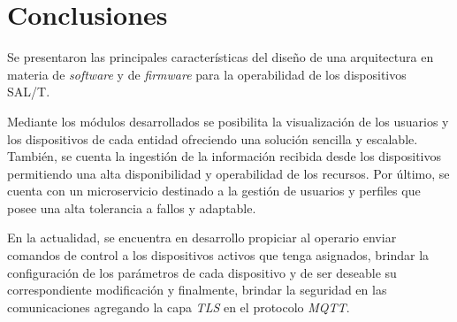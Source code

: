 
\section{Conclusiones}

Se presentaron las principales características del diseño de una arquitectura en materia de \textit{software} y de \textit{firmware} para la operabilidad de los dispositivos SAL/T.

Mediante los módulos desarrollados se posibilita la visualización de los usuarios y los dispositivos de cada entidad ofreciendo una solución sencilla y escalable. También, se cuenta la ingestión de la información recibida desde los dispositivos permitiendo una alta disponibilidad y operabilidad de los recursos. Por último, se cuenta con un microservicio destinado a la gestión de usuarios y perfiles que posee una alta tolerancia a fallos y adaptable.

En la actualidad, se encuentra en desarrollo propiciar al operario enviar comandos de control a los dispositivos activos que tenga asignados, brindar la configuración de los parámetros de cada dispositivo y de ser deseable su correspondiente modificación y finalmente, brindar la seguridad en las comunicaciones agregando la capa \textit{TLS} en el protocolo \textit{MQTT}.
